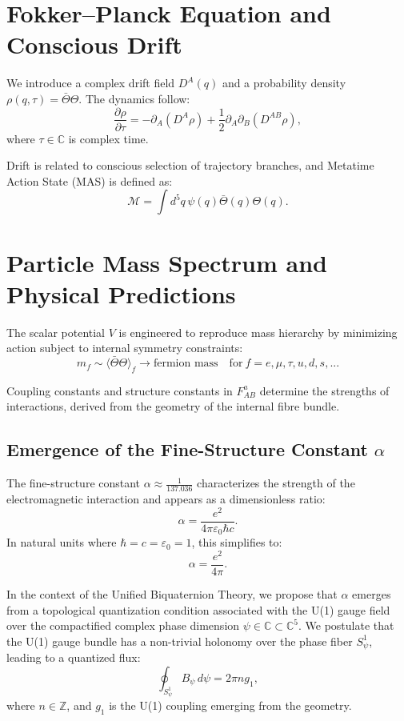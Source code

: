 \documentclass[12pt]{article}
\begin{document}
\section{Fokker--Planck Equation and Conscious Drift}
We introduce a complex drift field \( D^A(q) \) and a probability density \( \rho(q,\tau) = \bar{\Theta} \Theta \). The dynamics follow:
\[ \frac{\partial \rho}{\partial \tau} = -\partial_A ( D^A \rho ) + \frac{1}{2} \partial_A \partial_B (D^{AB} \rho), \]
where \( \tau \in \mathbb{C} \) is complex time.

Drift is related to conscious selection of trajectory branches, and Metatime Action State (MAS) is defined as:
\[ \mathcal{M} = \int d^5q\, \psi(q) \bar{\Theta}(q) \Theta(q). \]

\section{Particle Mass Spectrum and Physical Predictions}
The scalar potential \( V \) is engineered to reproduce mass hierarchy by minimizing action subject to internal symmetry constraints:
\[ m_f \sim \langle \bar{\Theta} \Theta \rangle_f \rightarrow \text{fermion mass} \quad \text{for}\ f = e, \mu, \tau, u, d, s, ... \]

Coupling constants and structure constants in \( F_{AB}^a \) determine the strengths of interactions, derived from the geometry of the internal fibre bundle.

\subsection{Emergence of the Fine-Structure Constant \texorpdfstring{\( \alpha \)}{alpha}}

The fine-structure constant \( \alpha \approx \frac{1}{137.036} \) characterizes the strength of the electromagnetic interaction and appears as a dimensionless ratio:
\[
\alpha = \frac{e^2}{4\pi \varepsilon_0 \hbar c}.
\]
In natural units where \( \hbar = c = \varepsilon_0 = 1 \), this simplifies to:
\[
\alpha = \frac{e^2}{4\pi}.
\]

In the context of the Unified Biquaternion Theory, we propose that \( \alpha \) emerges from a topological quantization condition associated with the U(1) gauge field over the compactified complex phase dimension \( \psi \in \mathbb{C} \subset \mathbb{C}^5 \). We postulate that the U(1) gauge bundle has a non-trivial holonomy over the phase fiber \( S^1_\psi \), leading to a quantized flux:
\[
\oint_{S^1_\psi} B_\psi\, d\psi = 2\pi n g_1,
\]
where \( n \in \mathbb{Z} \), and \( g_1 \) is the U(1) coupling emerging from the geometry.
\end{document}
